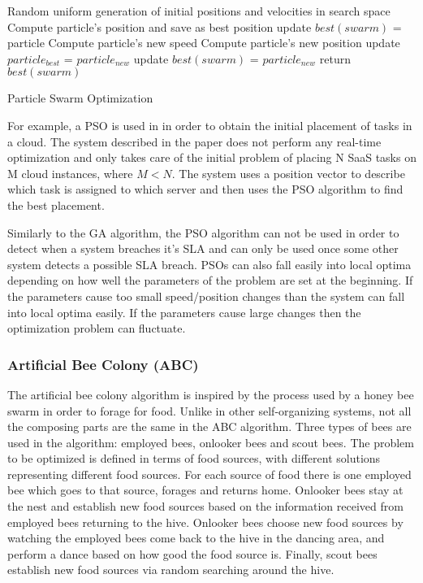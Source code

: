 \begin{algorithm}
\begin{algorithmic}
\State Random uniform generation of initial positions and velocities in search space
	\State Compute particle's position and save as best position
		\State update $best(swarm)$ = particle
	\EndIf
\EndFor
{}
		\State Compute particle's new speed
		\State Compute particle's new position
			\State update $particle_{best}$ = $particle_{new}$ 
		\EndIf
			\State update $best(swarm)$ = $particle_{new}$
		\EndIf
	\EndFor
\EndWhile
\State return $best(swarm)$
\end{algorithmic}
\caption{Particle Swarm Optimization}\label{algo:pso}
\end{algorithm}

For example, a PSO is used in \cite{selforg:pso} in order to obtain the initial placement of tasks in a cloud. The system described in the paper does not perform any real-time optimization and only takes care of the initial problem of placing N SaaS tasks on M cloud instances, where $M < N$. The system uses a position vector to describe which task is assigned to which server and then uses the PSO algorithm to find the best placement.

Similarly to the GA algorithm, the PSO algorithm can not be used in order to detect when a system breaches it's SLA and can only be used once some other system detects a possible SLA breach. PSOs can also fall easily into local optima depending on how well the parameters of the problem are set at the beginning. If the parameters cause too small speed/position changes than the system can fall into local optima easily. If the parameters cause large changes then the optimization problem can fluctuate.

\subsubsection{Artificial Bee Colony (ABC)}

The artificial bee colony algorithm \cite{selforg:abc} is inspired by the process used by a honey bee swarm in order to forage for food. Unlike in other self-organizing systems, not all the composing parts are the same in the ABC algorithm. Three types of bees are used in the algorithm: employed bees, onlooker bees and scout bees. The problem to be optimized is defined in terms of food sources, with different solutions representing different food sources. For each source of food there is one employed bee which goes to that source, forages and returns home. Onlooker bees stay at the nest and establish new food sources based on the information received from employed bees returning to the hive. Onlooker bees choose new food sources by watching the employed bees come back to the hive in the dancing area, and perform a dance based on how good the food source is. Finally, scout bees establish new food sources via random searching around the hive.

